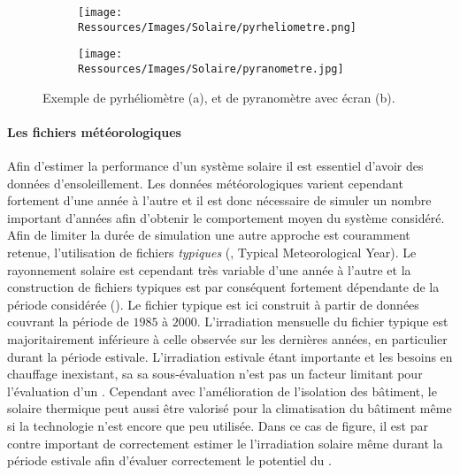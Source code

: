 \begin{figure}
    \centering
    \begin{subfigure}[b]{0.45\textwidth}
        \centering
        \texttt{[image: Ressources/Images/Solaire/pyrheliometre.png]}
        \caption{}
        \label{fig:schema_pyrheliometre}
    \end{subfigure}
    \quad
    \begin{subfigure}[b]{0.45\textwidth}
        \centering
        \texttt{[image: Ressources/Images/Solaire/pyranometre.jpg]}
        \caption{}
        \label{fig:schema_pyranometre}
    \end{subfigure}
    \caption[Exemple de pyrhéliomètre et de pyranomètre avec écran]
             {Exemple de pyrhéliomètre (a), et de pyranomètre avec écran (b).}
    \label{fig:image_mesure_rayonnement}
\end{figure}

\paragraph{Les fichiers météorologiques} %
\label{par:les_fichiers_meteorologiques}
Afin d’estimer la performance d’un système solaire il est essentiel d’avoir des données
d’ensoleillement. Les données météorologiques varient cependant fortement d’une année à
l’autre et il est donc nécessaire de simuler un nombre important d’années afin d’obtenir
le comportement moyen du système considéré. Afin de limiter la durée de simulation une
autre approche est couramment retenue, l’utilisation de fichiers \textit{typiques}
(, Typical Meteorological Year). Le rayonnement solaire est cependant
très variable d’une année à l’autre et la construction de fichiers typiques est par
conséquent fortement dépendante de la période considérée ().
Le fichier typique est ici construit à partir de données couvrant la période de $1985$ à
$2000$. L’irradiation mensuelle du fichier typique est majoritairement inférieure à celle
observée sur les dernières années, en particulier durant la période estivale.
L’irradiation estivale étant importante et les besoins en chauffage inexistant, sa sa
sous-évaluation n’est pas un facteur limitant pour l’évaluation d’un . Cependant
avec l’amélioration de l’isolation des bâtiment, le solaire thermique peut aussi être
valorisé pour la climatisation du bâtiment même si la technologie n’est encore que peu
utilisée. Dans ce cas de figure, il est par contre important de correctement estimer le l’irradiation
solaire même durant la période estivale afin d’évaluer correctement le potentiel du .

